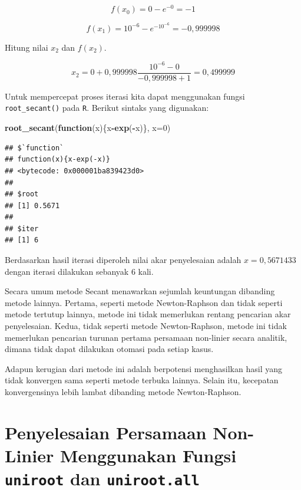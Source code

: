 \documentclass[
]{book}
\newenvironment{Shaded}{\begin{snugshade}}{\end{snugshade}}
\newcommand{\AttributeTok}[1]{\textcolor[rgb]{0.13,0.29,0.53}{#1}}
\newcommand{\ControlFlowTok}[1]{\textcolor[rgb]{0.13,0.29,0.53}{\textbf{#1}}}
\newcommand{\DecValTok}[1]{\textcolor[rgb]{0.00,0.00,0.81}{#1}}
\newcommand{\FunctionTok}[1]{\textcolor[rgb]{0.13,0.29,0.53}{\textbf{#1}}}
\newcommand{\NormalTok}[1]{#1}
\newcommand{\SpecialCharTok}[1]{\textcolor[rgb]{0.81,0.36,0.00}{\textbf{#1}}}
\theoremstyle{definition}
\theoremstyle{definition}
\theoremstyle{definition}
\theoremstyle{definition}
\theoremstyle{remark}
\begin{document}
\[
f\left(x_0 \right)=0-e^{-0}=-1
\]

\[
f\left(x_1 \right)=10^{-6}-e^{-10^{-6}}=-0,999998
\]

Hitung nilai \(x_2\) dan \(f\left(x_2 \right)\).

\[
x_2=0+0,999998\frac{10^{-6}-0}{-0,999998+1}=0,499999
\]

Untuk mempercepat proses iterasi kita dapat menggunakan fungsi \texttt{root\_secant()} pada \texttt{R}. Berikut sintaks yang digunakan:

\begin{Shaded}
\begin{Highlighting}[]
\FunctionTok{root\_secant}\NormalTok{(}\ControlFlowTok{function}\NormalTok{(x)\{x}\SpecialCharTok{{-}}\FunctionTok{exp}\NormalTok{(}\SpecialCharTok{{-}}\NormalTok{x)\}, }\AttributeTok{x=}\DecValTok{0}\NormalTok{)}
\end{Highlighting}
\end{Shaded}

\begin{verbatim}
## $`function`
## function(x){x-exp(-x)}
## <bytecode: 0x000001ba839423d0>
## 
## $root
## [1] 0.5671
## 
## $iter
## [1] 6
\end{verbatim}

Berdasarkan hasil iterasi diperoleh nilai akar penyelesaian adalah \(x=0,5671433\) dengan iterasi dilakukan sebanyak \(6\) kali.

Secara umum metode Secant menawarkan sejumlah keuntungan dibanding metode lainnya. Pertama, seperti metode Newton-Raphson dan tidak seperti metode tertutup lainnya, metode ini tidak memerlukan rentang pencarian akar penyelesaian. Kedua, tidak seperti metode Newton-Raphson, metode ini tidak memerlukan pencarian turunan pertama persamaan non-linier secara analitik, dimana tidak dapat dilakukan otomasi pada setiap kasus.

Adapun kerugian dari metode ini adalah berpotensi menghasilkan hasil yang tidak konvergen sama seperti metode terbuka lainnya. Selain itu, kecepatan konvergensinya lebih lambat dibanding metode Newton-Raphson.

\hypertarget{uniroot}{%
\section{\texorpdfstring{Penyelesaian Persamaan Non-Linier Menggunakan Fungsi \texttt{uniroot} dan \texttt{uniroot.all}}{Penyelesaian Persamaan Non-Linier Menggunakan Fungsi uniroot dan uniroot.all}}\label{uniroot}}
\end{document}
